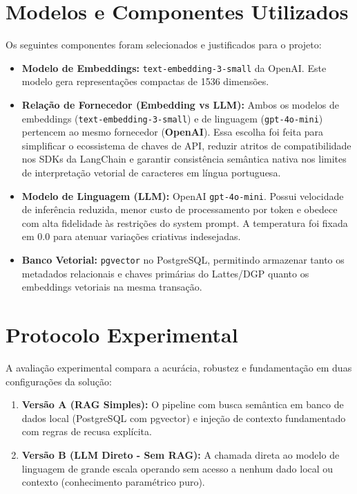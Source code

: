 \documentclass[12pt,a4paper]{article}
\begin{document}
\section{Modelos e Componentes Utilizados}
Os seguintes componentes foram selecionados e justificados para o projeto:
\begin{itemize}
    \item \textbf{Modelo de Embeddings:} \texttt{text-embedding-3-small} da OpenAI. Este modelo gera representações compactas de 1536 dimensões.
    \item \textbf{Relação de Fornecedor (Embedding vs LLM):} Ambos os modelos de embeddings (\texttt{text-embedding-3-small}) e de linguagem (\texttt{gpt-4o-mini}) pertencem ao mesmo fornecedor (\textbf{OpenAI}). Essa escolha foi feita para simplificar o ecossistema de chaves de API, reduzir atritos de compatibilidade nos SDKs da LangChain e garantir consistência semântica nativa nos limites de interpretação vetorial de caracteres em língua portuguesa.
    \item \textbf{Modelo de Linguagem (LLM):} OpenAI \texttt{gpt-4o-mini}. Possui velocidade de inferência reduzida, menor custo de processamento por token e obedece com alta fidelidade às restrições do system prompt. A temperatura foi fixada em $0.0$ para atenuar variações criativas indesejadas.
    \item \textbf{Banco Vetorial:} \texttt{pgvector} no PostgreSQL, permitindo armazenar tanto os metadados relacionais e chaves primárias do Lattes/DGP quanto os embeddings vetoriais na mesma transação.
\end{itemize}

\section{Protocolo Experimental}
A avaliação experimental compara a acurácia, robustez e fundamentação em duas configurações da solução:
\begin{enumerate}
    \item \textbf{Versão A (RAG Simples):} O pipeline com busca semântica em banco de dados local (PostgreSQL com pgvector) e injeção de contexto fundamentado com regras de recusa explícita.
    \item \textbf{Versão B (LLM Direto - Sem RAG):} A chamada direta ao modelo de linguagem de grande escala operando sem acesso a nenhum dado local ou contexto (conhecimento paramétrico puro).
\end{enumerate}
\end{document}
